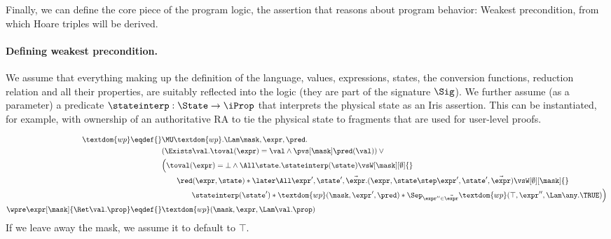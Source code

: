 Finally, we can define the core piece of the program logic, the assertion that reasons about program behavior: Weakest precondition, from which Hoare triples will be derived.

\paragraph{Defining weakest precondition.}
We assume that everything making up the definition of the language, \ie values, expressions, states, the conversion functions, reduction relation and all their properties, are suitably reflected into the logic (\ie they are part of the signature $\Sig$).
We further assume (as a parameter) a predicate $\stateinterp : \State \to \iProp$ that interprets the physical state as an Iris assertion.
This can be instantiated, for example, with ownership of an authoritative RA to tie the physical state to fragments that are used for user-level proofs.

\begin{align*}
  \textdom{wp} \eqdef{}& \MU \textdom{wp}. \Lam \mask, \expr, \pred. \\
        & (\Exists\val. \toval(\expr) = \val \land \pvs[\mask] \pred(\val)) \lor {}\\
        & \Bigl(\toval(\expr) = \bot \land \All \state. \stateinterp(\state) \vsW[\mask][\emptyset] {}\\
        &\qquad \red(\expr, \state) * \later\All \expr', \state', \vec\expr. (\expr, \state \step \expr', \state', \vec\expr) \vsW[\emptyset][\mask] {}\\
        &\qquad\qquad \stateinterp(\state') * \textdom{wp}(\mask, \expr', \pred) * \Sep_{\expr'' \in \vec\expr} \textdom{wp}(\top, \expr'', \Lam \any. \TRUE)\Bigr) \\
  \wpre\expr[\mask]{\Ret\val. \prop} \eqdef{}& \textdom{wp}(\mask, \expr, \Lam\val.\prop)
\end{align*}
If we leave away the mask, we assume it to default to $\top$.

